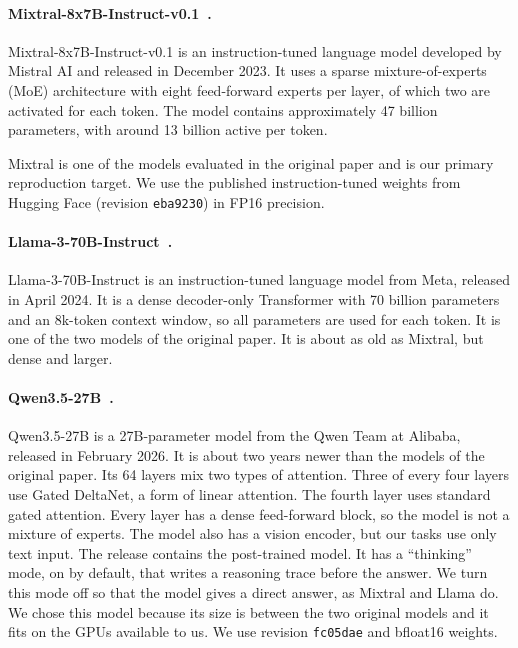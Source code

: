 \paragraph{Mixtral-8x7B-Instruct-v0.1~\cite{mixtral-8x7b-instruct-hf}.}

Mixtral-8x7B-Instruct-v0.1 is an instruction-tuned
language model developed by Mistral AI and released
in December 2023. It uses a sparse mixture-of-experts
(MoE) architecture with eight feed-forward experts
per layer, of which two are activated for each token.
The model contains approximately 47 billion parameters,
with around 13 billion active per token.

Mixtral is one of the models evaluated in the original
paper and is our primary reproduction target. We use
the published instruction-tuned weights from Hugging
Face (revision \texttt{eba9230}) in FP16 precision.

\paragraph{Llama-3-70B-Instruct~\cite{llama3-70b-instruct-hf}.}
Llama-3-70B-Instruct is an instruction-tuned language model from Meta,
released in April 2024. It is a dense decoder-only Transformer with 70 billion parameters and an 8k-token context window, so all parameters are used for each token. It is one of the two models of the original paper. It is about as old as Mixtral, but dense and larger.

\paragraph{Qwen3.5-27B~\cite{qwen35-27b-hf}.}
Qwen3.5-27B is a 27B-parameter model from the Qwen Team at Alibaba, released in
February 2026. It is about two years newer than the models of the original
paper. Its 64 layers mix two types of attention. Three of every four layers use
Gated DeltaNet, a form of linear attention. The fourth layer uses standard
gated attention. Every layer has a dense feed-forward block, so the model is
not a mixture of experts. The model also has a vision encoder, but our tasks
use only text input. The release contains the post-trained model. It has a
``thinking'' mode, on by default, that writes a reasoning trace before the
answer. We turn this mode off so that the model gives a direct answer, as
Mixtral and Llama do. We chose this model because its size is between the two
original models and it fits on the GPUs available to us. We use revision
\texttt{fc05dae} and bfloat16 weights.


